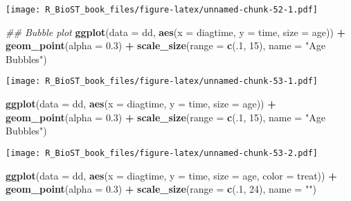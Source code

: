 \documentclass[
]{book}
\newenvironment{Shaded}{\begin{snugshade}}{\end{snugshade}}
\newcommand{\CommentTok}[1]{\textcolor[rgb]{0.56,0.35,0.01}{\textit{#1}}}
\newcommand{\DataTypeTok}[1]{\textcolor[rgb]{0.13,0.29,0.53}{#1}}
\newcommand{\DecValTok}[1]{\textcolor[rgb]{0.00,0.00,0.81}{#1}}
\newcommand{\FloatTok}[1]{\textcolor[rgb]{0.00,0.00,0.81}{#1}}
\newcommand{\KeywordTok}[1]{\textcolor[rgb]{0.13,0.29,0.53}{\textbf{#1}}}
\newcommand{\NormalTok}[1]{#1}
\newcommand{\OperatorTok}[1]{\textcolor[rgb]{0.81,0.36,0.00}{\textbf{#1}}}
\newcommand{\StringTok}[1]{\textcolor[rgb]{0.31,0.60,0.02}{#1}}
\begin{document}
\texttt{[image: R\_BioST\_book\_files/figure-latex/unnamed-chunk-52-1.pdf]}

\begin{Shaded}
\begin{Highlighting}[]
\CommentTok{\#\# Bubble plot}
\KeywordTok{ggplot}\NormalTok{(}\DataTypeTok{data =}\NormalTok{ dd, }\KeywordTok{aes}\NormalTok{(}\DataTypeTok{x =}\NormalTok{ diagtime, }\DataTypeTok{y =}\NormalTok{ time, }\DataTypeTok{size =}\NormalTok{ age)) }\OperatorTok{+}\StringTok{ }
\StringTok{  }\KeywordTok{geom\_point}\NormalTok{(}\DataTypeTok{alpha =} \FloatTok{0.3}\NormalTok{) }\OperatorTok{+}\StringTok{ }
\StringTok{  }\KeywordTok{scale\_size}\NormalTok{(}\DataTypeTok{range =} \KeywordTok{c}\NormalTok{(.}\DecValTok{1}\NormalTok{, }\DecValTok{15}\NormalTok{), }\DataTypeTok{name =} \StringTok{"Age Bubbles"}\NormalTok{)}
\end{Highlighting}
\end{Shaded}

\texttt{[image: R\_BioST\_book\_files/figure-latex/unnamed-chunk-53-1.pdf]}

\begin{Shaded}
\begin{Highlighting}[]
\KeywordTok{ggplot}\NormalTok{(}\DataTypeTok{data =}\NormalTok{ dd, }\KeywordTok{aes}\NormalTok{(}\DataTypeTok{x =}\NormalTok{ diagtime, }\DataTypeTok{y =}\NormalTok{ time, }\DataTypeTok{size =}\NormalTok{ age)) }\OperatorTok{+}\StringTok{ }
\StringTok{  }\KeywordTok{geom\_point}\NormalTok{(}\DataTypeTok{alpha =} \FloatTok{0.3}\NormalTok{) }\OperatorTok{+}\StringTok{ }
\StringTok{  }\KeywordTok{scale\_size}\NormalTok{(}\DataTypeTok{range =} \KeywordTok{c}\NormalTok{(.}\DecValTok{1}\NormalTok{, }\DecValTok{15}\NormalTok{), }\DataTypeTok{name =} \StringTok{"Age Bubbles"}\NormalTok{)}
\end{Highlighting}
\end{Shaded}

\texttt{[image: R\_BioST\_book\_files/figure-latex/unnamed-chunk-53-2.pdf]}

\begin{Shaded}
\begin{Highlighting}[]
\KeywordTok{ggplot}\NormalTok{(}\DataTypeTok{data =}\NormalTok{ dd, }\KeywordTok{aes}\NormalTok{(}\DataTypeTok{x =}\NormalTok{ diagtime, }\DataTypeTok{y =}\NormalTok{ time, }\DataTypeTok{size =}\NormalTok{ age, }\DataTypeTok{color =}\NormalTok{ treat)) }\OperatorTok{+}\StringTok{ }
\StringTok{  }\KeywordTok{geom\_point}\NormalTok{(}\DataTypeTok{alpha =} \FloatTok{0.3}\NormalTok{) }\OperatorTok{+}\StringTok{ }
\KeywordTok{scale\_size}\NormalTok{(}\DataTypeTok{range =} \KeywordTok{c}\NormalTok{(.}\DecValTok{1}\NormalTok{, }\DecValTok{24}\NormalTok{), }\DataTypeTok{name =} \StringTok{""}\NormalTok{)}
\end{Highlighting}
\end{Shaded}
\end{document}
